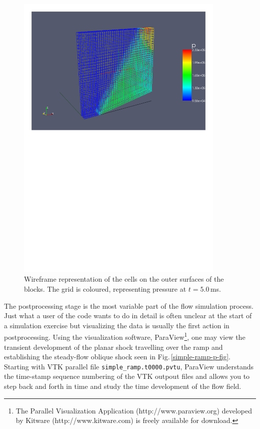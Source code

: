 \begin{figure}[htbp]
\begin{center}
\includegraphics[width=10cm,viewport=27 444 571 818]{../3D/simple_ramp/simple-ramp-wire-frame-p.pdf}
\end{center}
\caption{Wireframe representation of the cells on the outer surfaces of the blocks.
  The grid is coloured, representing pressure at $t = 5.0$\,ms.}
\label{simple-ramp-wireframe-fig}
\end{figure}

\medskip
The postprocessing stage is the most variable part of the flow simulation
process.
Just what a user of the code wants to do in detail is often unclear at the
start of a simulation exercise but visualizing the data is usually the first
action in postprocessing.
Using the visualization software, ParaView\footnote{The Parallel Visualization
  Application (http://www.paraview.org) developed by Kitware
  (http://www.kitware.com) is freely available for download.},
one may view the transient development of the planar shock travelling over the
ramp and establishing the steady-flow oblique shock seen in
Fig.\,\ref{simple-ramp-p-fig}.
Starting with VTK parallel file \texttt{simple\_ramp.t0000.pvtu}, 
ParaView understands the time-stamp sequence
numbering of the VTK outpout files and allows you to step back and forth in
time and study the time development of the flow field.

